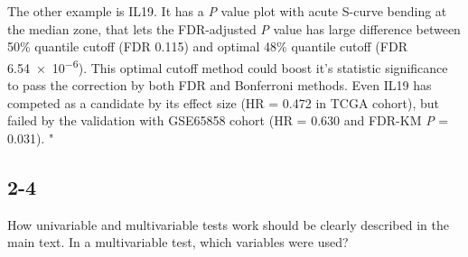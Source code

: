 \documentclass[preprint,12pt]{elsarticle}
\newenvironment{MyIndent}
{\par\leftskip1cm\relax\rightskip1cm\relax}
{\par\leftskip0cm\relax\rightskip0cm\relax}
\newenvironment{MyColorPar}[1]{%
    \leavevmode\color{#1}\ignorespaces%
}{%
}%
\begin{document}
\begin{MyColorPar}{blue}
\begin{MyIndent}
\begin{MyColorPar}{red}
The other example is IL19. It has a \textit{P} value plot with acute S-curve bending at the median zone, that lets the FDR-adjusted \textit{P} value has large difference between 50\% quantile cutoff (FDR 0.115) and optimal 48\% quantile cutoff (FDR \num{6.54e-6}). This optimal cutoff method could boost it's statistic significance to pass the correction by both FDR and Bonferroni methods. Even IL19 has competed as a candidate by its effect size (HR = 0.472 in TCGA cohort), but failed by the validation with GSE65858 cohort (HR = 0.630 and FDR-KM \textit{P} = 0.031).
"



\end{MyColorPar} %
\end{MyIndent}

\end{MyColorPar} %



\subsection*{2-4} %
How univariable and multivariable tests work should be clearly described in the main text. In a multivariable test, which variables were used?
\end{document}
